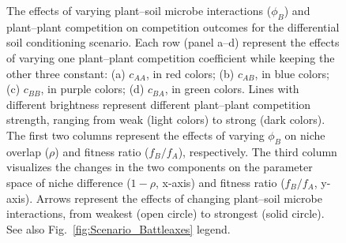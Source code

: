 \clearpage
\begin{figure}[htbp]
	\centering
	\caption[The effects of varying plant--soil microbe interactions ($\phi_{B}$) and plant--plant competition on competition outcomes for the differential soil conditioning scenario.]
		{The effects of varying plant--soil microbe interactions ($\phi_{B}$) and plant--plant competition on competition outcomes for the differential soil conditioning scenario.
		Each row (panel a--d) represent the effects of varying one plant--plant competition coefficient while keeping the other three constant: (a) $c_{AA}$, in red colors; (b) $c_{AB}$, in blue colors; (c) $c_{BB}$, in purple colors; (d) $c_{BA}$, in green colors. Lines with different brightness represent different plant--plant competition strength, ranging from weak (light colors) to strong (dark colors).
		The first two columns represent the effects of varying $\phi_{B}$ on niche overlap ($\rho$) and fitness ratio ($f_{B}/f_{A}$), respectively. The third column visualizes the changes in the two components on the parameter space of niche difference ($1 - \rho$, x-axis) and fitness ratio ($f_{B}/f_{A}$, y-axis). Arrows represent the effects of changing plant--soil microbe interactions, from weakest (open circle) to strongest (solid circle). See also Fig.~\ref{fig:Scenario_Battleaxes} legend.}
	\label{fig:Soil_Conditioning_everything}
\end{figure}

